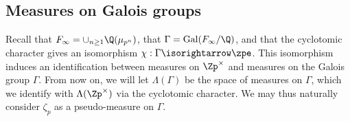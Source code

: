 \documentclass[a4paper,10pt, english, reqno]{smfart}
\newcommand{\CWnote}[1]{
	\begin{color}{red}
		\marginpar{$\spadesuit$} #1
		---CW
	\end{color}
}
\newcommand{\GG}{\Gamma}
\numberwithin{equation}{section}
\begin{document}
\subsection{Measures on Galois groups} \label{sec:measures on galois groups}



Recall that $F_\infty = \cup_{n \geq 1} \Q(\mu_{p^n})$, that $\GG = \mathrm{Gal}(F_\infty / \Q)$, and that the cyclotomic character gives an isomorphism $\chi : \GG \isorightarrow \zpe$. This isomorphism induces an identification between measures on $\Zp^\times$ and measures on the Galois group $\GG$. From now on, we will let $\Lambda(\GG)$ be the space of measures on $\GG$, which we identify with $\Lambda(\Zp^\times)$ via the cyclotomic character. We may thus naturally consider $\zeta_p$ as a pseudo-measure on $\GG$. 


  
\end{document}
